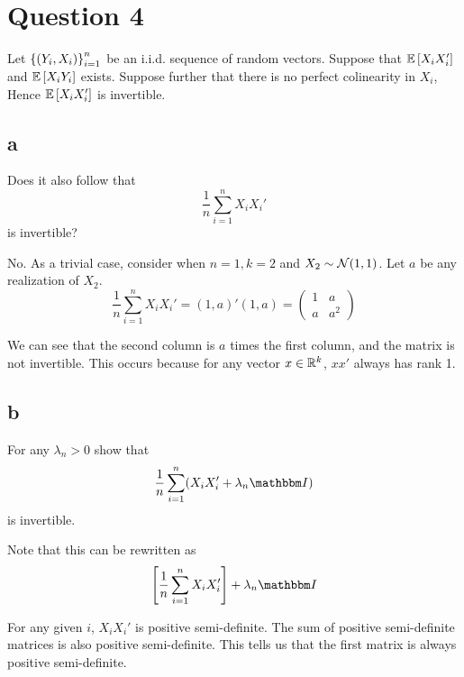 \documentclass[12pt]{paper}
\begin{document}
\section*{Question 4}


Let ${\left \{ (Y_i,X_i) \right \}}_{i=1}^n$ be an i.i.d. sequence of random
vectors. Suppose that $\mathbb{E} \left [ X_i X_i' \right ]$ and $\mathbb{E} \left [ X_i Y_i \right ]$
exists. Suppose further that there is no perfect colinearity in
$X_i$, Hence $\mathbb{E} \left [ X_i X_i' \right ]$ is invertible.

\subsection*{a}

Does it also follow that
\begin{equation*}
  \frac{1}{n} \sum_{i=1}^n X_i X_i'
\end{equation*} 
is invertible? \newline \newline

No. As a trivial case, consider when $n=1, k=2$ and $X_2 \sim \mathcal{N}( 1, 1
)$. Let $a$ be any realization of $X_2$.
\begin{equation*}
  \frac{1}{n} \sum_{i=1}^n X_i X_i' = (1,a)' (1,a) =
  \begin{pmatrix}
    1 & a\\ a & a^2
  \end{pmatrix}
\end{equation*}

We can see that the second column is $a$ times the first column, and
the matrix is not invertible. This occurs because for any vector $x \in
\mathbb{R}^k$, $x x'$ always has rank 1.

\subsection*{b}

For any $\lambda_n > 0$ show that
\begin{equation*}
  \frac{1}{n} \sum_{i=1}^n ( X_i X_i' + \lambda_n \eye )
\end{equation*}
is invertible. \newline \newline

Note that this can be rewritten as
\begin{equation*}
  \brak{\frac{1}{n} \sum_{i=1}^n  X_i X_i'} + \lambda_n \eye 
\end{equation*}

For any given $i$, $X_i X_i'$ is positive semi-definite. The sum of
positive semi-definite matrices is also positive semi-definite. This
tells us that the first matrix is always positive semi-definite.
\end{document}
